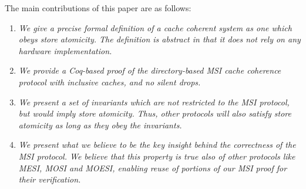 The main contributions of this paper are as follows:
\begin{enumerate}

\item \emph{We give a precise formal definition of a cache coherent
  system as one which obeys store atomicity. The definition is
  abstract in that it does not rely on any hardware implementation.}

\item \emph{We provide a Coq-based proof of the directory-based MSI
  cache coherence protocol with inclusive caches, and no silent
  drops.}

\item \emph{We present a set of invariants which are not restricted to
  the MSI protocol, but would imply store atomicity. Thus, other
  protocols will also satisfy store atomicity as long as they obey the
  invariants.}

\item \emph{We present what we believe to be the key insight behind
  the correctness of the MSI protocol. We believe that this property
  is true also of other protocols like MESI, MOSI and MOESI, enabling
  reuse of portions of our MSI proof for their verification.}

\end{enumerate}


%

